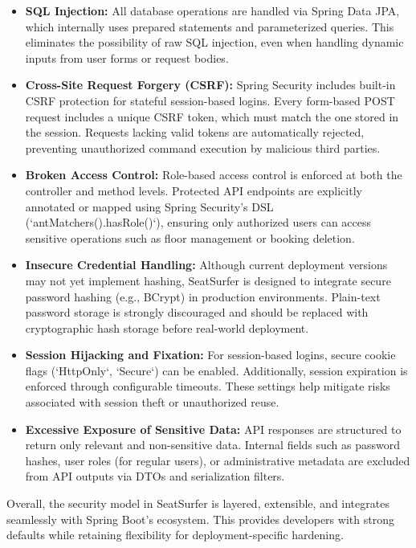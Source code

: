 \documentclass[12pt,a4paper]{report}
\begin{document}
\begin{itemize}
\item \textbf{SQL Injection:}
All database operations are handled via Spring Data JPA, which internally uses prepared statements and parameterized queries. This eliminates the possibility of raw SQL injection, even when handling dynamic inputs from user forms or request bodies.
\item \textbf{Cross-Site Request Forgery (CSRF):}  
Spring Security includes built-in CSRF protection for stateful session-based logins. Every form-based POST request includes a unique CSRF token, which must match the one stored in the session. Requests lacking valid tokens are automatically rejected, preventing unauthorized command execution by malicious third parties.

\item \textbf{Broken Access Control:}  
Role-based access control is enforced at both the controller and method levels. Protected API endpoints are explicitly annotated or mapped using Spring Security's DSL (`antMatchers().hasRole()`), ensuring only authorized users can access sensitive operations such as floor management or booking deletion.

\item \textbf{Insecure Credential Handling:}  
Although current deployment versions may not yet implement hashing, SeatSurfer is designed to integrate secure password hashing (e.g., BCrypt) in production environments. Plain-text password storage is strongly discouraged and should be replaced with cryptographic hash storage before real-world deployment.

\item \textbf{Session Hijacking and Fixation:}  
For session-based logins, secure cookie flags (`HttpOnly`, `Secure`) can be enabled. Additionally, session expiration is enforced through configurable timeouts. These settings help mitigate risks associated with session theft or unauthorized reuse.

\item \textbf{Excessive Exposure of Sensitive Data:}  
API responses are structured to return only relevant and non-sensitive data. Internal fields such as password hashes, user roles (for regular users), or administrative metadata are excluded from API outputs via DTOs and serialization filters.
\end{itemize}

Overall, the security model in SeatSurfer is layered, extensible, and integrates seamlessly with Spring Boot's ecosystem. This provides developers with strong defaults while retaining flexibility for deployment-specific hardening.
\end{document}
